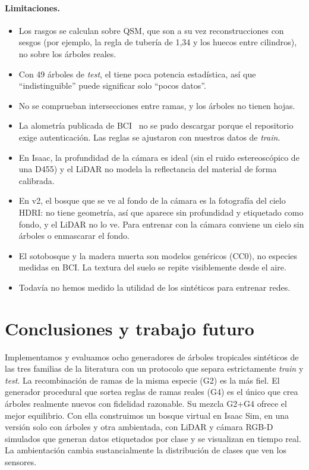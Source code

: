 \documentclass[11pt,a4paper]{article}
\newcommand{\NNA}{\text{1-NNA}}
\begin{document}
\paragraph{Limitaciones.}
\begin{itemize}
  \item Los rasgos se calculan sobre QSM, que son a su vez reconstrucciones con sesgos (por ejemplo, la regla de tubería de 1,34 y los huecos entre cilindros), no sobre los árboles reales.
  \item Con 49 árboles de \emph{test}, el \NNA{} tiene poca potencia estadística, así que \enquote{indistinguible} puede significar solo \enquote{pocos datos}.
  \item No se comprueban intersecciones entre ramas, y los árboles no tienen hojas.
  \item La alometría publicada de BCI~\cite{martinezcano2019allometry} no se pudo descargar porque el repositorio exige autenticación. Las reglas se ajustaron con nuestros datos de \emph{train}.
  \item En Isaac, la profundidad de la cámara es ideal (sin el ruido estereoscópico de una D455) y el LiDAR no modela la reflectancia del material de forma calibrada.
  \item En v2, el bosque que se ve al fondo de la cámara es la fotografía del cielo HDRI: no tiene geometría, así que aparece sin profundidad y etiquetado como fondo, y el LiDAR no lo ve. Para entrenar con la cámara conviene un cielo sin árboles o enmascarar el fondo.
  \item El sotobosque y la madera muerta son modelos genéricos (CC0), no especies medidas en BCI. La textura del suelo se repite visiblemente desde el aire.
  \item Todavía no hemos medido la utilidad de los sintéticos para entrenar redes.
\end{itemize}

\section{Conclusiones y trabajo futuro}

Implementamos y evaluamos ocho generadores de árboles tropicales sintéticos de las tres familias de la literatura con un protocolo que separa estrictamente \emph{train} y \emph{test}. La recombinación de ramas de la misma especie (G2) es la más fiel. El generador procedural que sortea reglas de ramas reales (G4) es el único que crea árboles realmente nuevos con fidelidad razonable. Su mezcla G2+G4 ofrece el mejor equilibrio. Con ella construimos un bosque virtual en Isaac Sim, en una versión solo con árboles y otra ambientada, con LiDAR y cámara RGB-D simulados que generan datos etiquetados por clase y se visualizan en tiempo real. La ambientación cambia sustancialmente la distribución de clases que ven los sensores.
\end{document}
